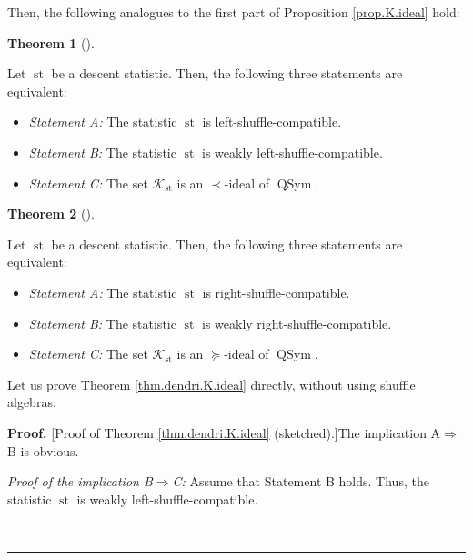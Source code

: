 \documentclass[numbers=enddot,12pt,final,onecolumn,notitlepage]{scrartcl}%
\theoremstyle{definition}
\newtheorem{theo}{Theorem}[section]
\newenvironment{theorem}[1][]
{\begin{theo}[#1]\begin{leftbar}}
{\end{leftbar}\end{theo}}
\newenvironment{proof}[1][Proof]{\noindent\textbf{#1.} }{\ \rule{0.5em}{0.5em}}
\newenvironment{verlong}{}{}
\begin{document}
\begin{verlong}
Then, the following analogues to the first part of Proposition
\ref{prop.K.ideal} hold:

\begin{theorem}
\label{thm.dendri.K.ideal}Let $\operatorname*{st}$ be a descent statistic.
Then, the following three statements are equivalent:

\begin{itemize}
\item \textit{Statement A:} The statistic $\operatorname*{st}$ is left-shuffle-compatible.

\item \textit{Statement B:} The statistic $\operatorname*{st}$ is weakly left-shuffle-compatible.

\item \textit{Statement C:} The set $\mathcal{K}_{\operatorname*{st}}$ is an
$\left.  \prec\right.  $-ideal of $\operatorname*{QSym}$.
\end{itemize}
\end{theorem}

\begin{theorem}
\label{thm.dendri.K.ideal-R}Let $\operatorname*{st}$ be a descent statistic.
Then, the following three statements are equivalent:

\begin{itemize}
\item \textit{Statement A:} The statistic $\operatorname*{st}$ is right-shuffle-compatible.

\item \textit{Statement B:} The statistic $\operatorname*{st}$ is weakly right-shuffle-compatible.

\item \textit{Statement C:} The set $\mathcal{K}_{\operatorname*{st}}$ is an
$\left.  \succeq\right.  $-ideal of $\operatorname*{QSym}$.
\end{itemize}
\end{theorem}

Let us prove Theorem \ref{thm.dendri.K.ideal} directly, without using shuffle algebras:

\begin{proof}
[Proof of Theorem \ref{thm.dendri.K.ideal} (sketched).]The implication
A$\Longrightarrow$B is obvious.

\textit{Proof of the implication B}$\Longrightarrow$\textit{C:} Assume that
Statement B holds. Thus, the statistic $\operatorname*{st}$ is weakly left-shuffle-compatible.


\end{proof}
\end{verlong}
\end{document}
